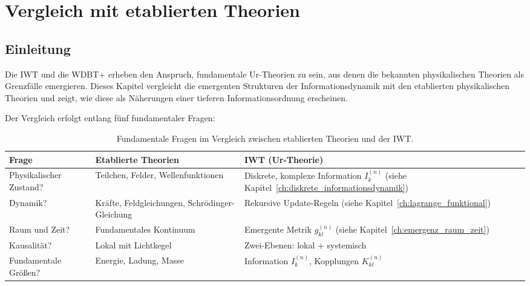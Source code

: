 
\chapter{Vergleich mit etablierten Theorien}
\label{app:vergleich}

\section{Einleitung}
\label{app:vergleich_einleitung}

Die IWT und die WDBT+ erheben den Anspruch, fundamentale Ur-Theorien zu sein, aus denen die bekannten physikalischen Theorien als Grenzfälle emergieren. Dieses Kapitel vergleicht die emergenten Strukturen der Informationsdynamik mit den etablierten physikalischen Theorien und zeigt, wie diese als Näherungen einer tieferen Informationsordnung erscheinen.

Der Vergleich erfolgt entlang fünf fundamentaler Fragen:

\begin{table}[htbp]
\centering
\small
\begin{tabularx}{\textwidth}{|X|X|X|}
\hline
\textbf{Frage} & \textbf{Etablierte Theorien} & \textbf{IWT (Ur-Theorie)} \\
\hline
Physikalischer Zustand? & Teilchen, Felder, Wellenfunktionen & Diskrete, komplexe Information \( I_k^{(n)} \) (siehe Kapitel~\ref{ch:diskrete_informationsdynamik}) \\
\hline
Dynamik? & Kräfte, Feldgleichungen, Schrödinger-Gleichung & Rekursive Update-Regeln (siehe Kapitel~\ref{ch:lagrange_funktional}) \\
\hline
Raum und Zeit? & Fundamentales Kontinuum & Emergente Metrik \( g_{kl}^{(n)} \) (siehe Kapitel~\ref{ch:emergenz_raum_zeit}) \\
\hline
Kausalität? & Lokal mit Lichtkegel & Zwei-Ebenen: lokal + systemisch \\
\hline
Fundamentale Größen? & Energie, Ladung, Masse & Information \( I_k^{(n)} \), Kopplungen \( K_{kl}^{(n)} \) \\
\hline
\end{tabularx}
\caption{Fundamentale Fragen im Vergleich zwischen etablierten Theorien und der IWT.}
\label{tab:vergleich_fragen}
\end{table}

